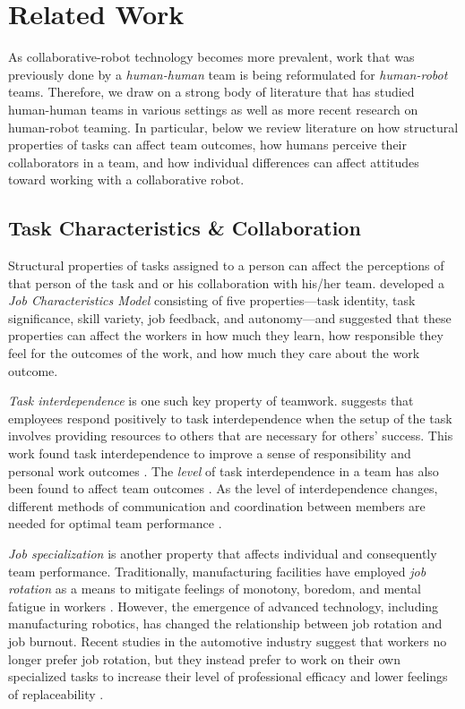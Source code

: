 \section{Related Work}
As collaborative-robot technology becomes more prevalent, work that was previously done by a \textit{human-human} team is being reformulated for \textit{human-robot} teams. Therefore, we draw on a strong body of literature that has studied human-human teams in various settings as well as more recent research on human-robot teaming. In particular, below we review literature on how structural properties of tasks can affect team outcomes, how humans perceive their collaborators in a team, and how individual differences can affect attitudes toward working with a collaborative robot.
       
\subsection{Task Characteristics \& Collaboration}
Structural properties of tasks assigned to a person can affect the perceptions of that person of the task and or his collaboration with his/her team. \citet{hackman1976motivation} developed a \textit{Job Characteristics Model} consisting of five properties---task identity, task significance, skill variety, job feedback, and autonomy---and suggested that these properties can affect the workers in how much they learn, how responsible they feel for the outcomes of the work, and how much they care about the work outcome.

\textit{Task interdependence} is one such key property of teamwork. \citet{kiggundu1983task} suggests that employees respond positively to task interdependence when the setup of the task involves providing resources to others that are necessary for others' success. This work found task interdependence to improve a sense of responsibility and personal work outcomes \cite{van1998motivating}. The \textit{level} of task interdependence in a team has also been found to affect team outcomes \cite{katz2005collective, langfred2005autonomy, liden1997task}. As the level of interdependence changes, different methods of communication and coordination between members are needed for optimal team performance \cite{espinosa2004explicit, butchibabu2016implicit}.

\textit{Job specialization} is another property that affects individual and consequently team performance. Traditionally, manufacturing facilities have employed \textit{job rotation} as a means to mitigate feelings of monotony, boredom, and mental fatigue in workers \cite{miller1973job,kuijer1999job}. However, the emergence of advanced technology, including manufacturing robotics, has changed the relationship between job rotation and job burnout. Recent studies in the automotive industry suggest that workers no longer prefer job rotation, but they instead prefer to work on their own specialized tasks to increase their level of professional efficacy and lower feelings of replaceability \cite{hsieh2004reassessment}.

